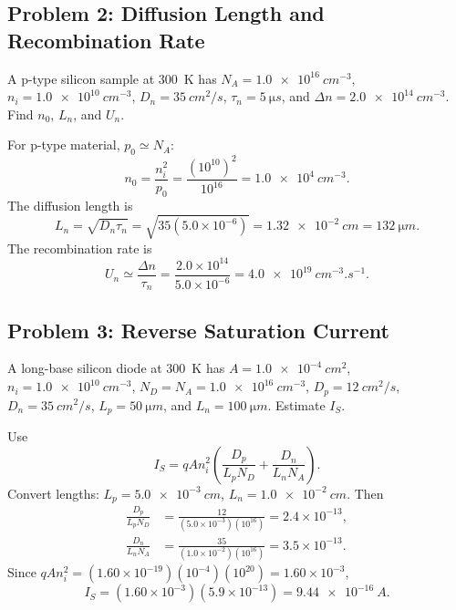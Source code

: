 \documentclass[11pt,a4paper]{article}
\newcommand{\dd}{\Delta}
\newcommand{\nint}{n_i}
\begin{document}
\subsection{Problem 2: Diffusion Length and Recombination Rate}

\begin{tcolorbox}[title={Question}]
A p-type silicon sample at \SI{300}{K} has \(N_A=\SI{1.0e16}{cm^{-3}}\), \(\nint=\SI{1.0e10}{cm^{-3}}\), \(D_n=\SI{35}{cm^2/s}\), \(\tau_n=\SI{5}{\micro s}\), and \(\dd n=\SI{2.0e14}{cm^{-3}}\). Find \(n_0\), \(L_n\), and \(U_n\).
\end{tcolorbox}

For p-type material, \(p_0\simeq N_A\):
\begin{equation}
  n_0=\frac{\nint^2}{p_0}=\frac{(10^{10})^2}{10^{16}}=\SI{1.0e4}{cm^{-3}}.
\end{equation}
The diffusion length is
\begin{equation}
  L_n=\sqrt{D_n\tau_n}=\sqrt{35(5.0\times10^{-6})}
  =\SI{1.32e-2}{cm}=\SI{132}{\micro m}.
\end{equation}
The recombination rate is
\begin{equation}
  U_n\simeq\frac{\dd n}{\tau_n}
  =\frac{2.0\times10^{14}}{5.0\times10^{-6}}
  =\SI{4.0e19}{cm^{-3}.s^{-1}}.
\end{equation}

\subsection{Problem 3: Reverse Saturation Current}

\begin{tcolorbox}[title={Question}]
A long-base silicon diode at \SI{300}{K} has \(A=\SI{1.0e-4}{cm^2}\), \(\nint=\SI{1.0e10}{cm^{-3}}\), \(N_D=N_A=\SI{1.0e16}{cm^{-3}}\), \(D_p=\SI{12}{cm^2/s}\), \(D_n=\SI{35}{cm^2/s}\), \(L_p=\SI{50}{\micro m}\), and \(L_n=\SI{100}{\micro m}\). Estimate \(I_S\).
\end{tcolorbox}

Use
\begin{equation}
  I_S=qA\nint^2\left(\frac{D_p}{L_pN_D}+\frac{D_n}{L_nN_A}\right).
\end{equation}
Convert lengths: \(L_p=\SI{5.0e-3}{cm}\), \(L_n=\SI{1.0e-2}{cm}\). Then
\begin{align}
  \frac{D_p}{L_pN_D}&=\frac{12}{(5.0\times10^{-3})(10^{16})}=2.4\times10^{-13},\\
  \frac{D_n}{L_nN_A}&=\frac{35}{(1.0\times10^{-2})(10^{16})}=3.5\times10^{-13}.
\end{align}
Since \(qA\nint^2=(1.60\times10^{-19})(10^{-4})(10^{20})=1.60\times10^{-3}\),
\begin{equation}
  I_S=(1.60\times10^{-3})(5.9\times10^{-13})=\SI{9.44e-16}{A}.
\end{equation}
\end{document}
